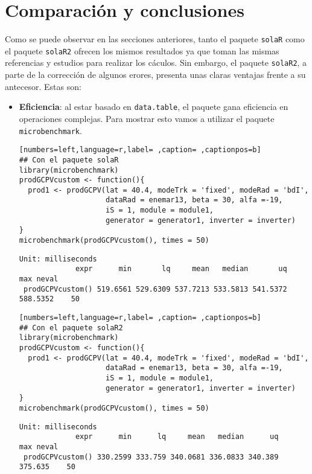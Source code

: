 \section{Comparación y conclusiones}
\label{sec:org8d2540f}
\label{sec:comparacion-conclusiones}
Como se puede observar en las secciones anteriores, tanto el paquete \texttt{solaR} como el paquete \texttt{solaR2} ofrecen los mismos resultados ya que toman las mismas referencias y estudios para realizar los cáculos. Sin embargo, el paquete \texttt{solaR2}, a parte de la corrección de algunos erores, presenta unas claras ventajas frente a su antecesor. Estas son:
\begin{itemize}
\item \textbf{Eficiencia}: al estar basado en \texttt{data.table}, el paquete gana eficiencia en operaciones complejas. Para mostrar esto vamos a utilizar el paquete \texttt{microbenchmark}.
\begin{lstlisting}[numbers=left,language=r,label= ,caption= ,captionpos=b]
## Con el paquete solaR
library(microbenchmark)
prodGCPVcustom <- function(){  
  prod1 <- prodGCPV(lat = 40.4, modeTrk = 'fixed', modeRad = 'bdI',
                    dataRad = enemar13, beta = 30, alfa =-19,
                    iS = 1, module = module1,
                    generator = generator1, inverter = inverter)
}
microbenchmark(prodGCPVcustom(), times = 50)
\end{lstlisting}

\begin{verbatim}
Unit: milliseconds
             expr      min       lq     mean   median       uq      max neval
 prodGCPVcustom() 519.6561 529.6309 537.7213 533.5813 541.5372 588.5352    50
\end{verbatim}


\begin{lstlisting}[numbers=left,language=r,label= ,caption= ,captionpos=b]
## Con el paquete solaR2
library(microbenchmark)
prodGCPVcustom <- function(){  
  prod1 <- prodGCPV(lat = 40.4, modeTrk = 'fixed', modeRad = 'bdI',
                    dataRad = enemar13, beta = 30, alfa =-19,
                    iS = 1, module = module1,
                    generator = generator1, inverter = inverter)
}
microbenchmark(prodGCPVcustom(), times = 50)
\end{lstlisting}

\begin{verbatim}
Unit: milliseconds
             expr      min      lq     mean   median      uq     max neval
 prodGCPVcustom() 330.2599 333.759 340.0681 336.0833 340.389 375.635    50
\end{verbatim}



\end{itemize}
